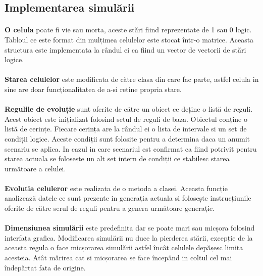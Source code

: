 \documentclass[11pt ,A4]{article}
\begin{document}
        \subsection{Implementarea simulării}
            \paragraph{}
                \textbf{O celula} poate fi vie sau morta, aceste stări fiind reprezentate de 1 sau 0 logic.
                Tabloul ce este format din mulțimea celulelor este stocat într-o matrice. Aceasta structura este implementata la rândul ei ca fiind un vector de vectorii de stări logice. 

            \paragraph{}
                \textbf{Starea celulelor} este modificata de către clasa din care fac parte, astfel celula in sine are doar funcționalitatea de a-si retine propria stare.

            \paragraph{}
                \textbf{Regulile de evoluție} sunt oferite de către un obiect ce deține o listă de reguli.
                Acest obiect este inițializat folosind setul de reguli de baza. Obiectul conține o listă de cerințe.
                Fiecare cerința are la rândul ei o lista de intervale si un set de condiții logice.
                Aceste condiții sunt folosite pentru a determina daca un anumit scenariu se aplica.
                In cazul in care scenariul est confirmat ca fiind potrivit pentru starea actuala se folosește un alt set intern de condiții ce stabilesc starea următoare a celulei.
            
            \paragraph{}
                \textbf{Evolutia celuleror} este realizata de o metoda a clasei.
                Aceasta funcție analizează datele ce sunt prezente in generația actuala si folosește instrucțiunile oferite de către serul de reguli pentru a genera următoare generație.

            \paragraph{}
                \textbf{Dimensiunea simulării} este predefinita dar se poate mari sau micșora folosind interfața grafica.
                Modificarea simulării nu duce la pierderea stării, excepție de la aceasta regula o face micșorarea simulării astfel încât celulele depășesc limita acesteia.
                Atât mărirea cat si micșorarea se face începând in coltul cel mai îndepărtat fata de origine.
\end{document}
